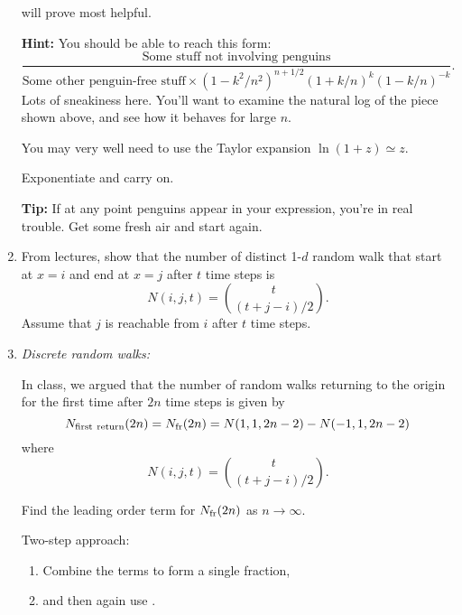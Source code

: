 \begin{enumerate}
  will prove most helpful.

  \textbf{Hint:}
  You should be able to reach this form:
  $$
  \frac{
    \mbox{Some stuff not involving penguins}
  }{
    \mbox{Some other penguin-free stuff} \times
    (1-k^2/n^2)^{n+1/2} 
    (1+k/n)^{k}(1-k/n)^{-k}
  }.
  $$
  Lots of sneakiness here.  You'll want to examine
  the natural log of the piece shown above, and see
  how it behaves for large $n$.  

  You may very well need to use
  the Taylor expansion $\ln(1+z) \simeq z$.
  
  Exponentiate and carry on.

  \textbf{Tip:}
  If at any point penguins appear in your expression, 
  you're in real trouble.  Get some fresh air and start again.

  
   \solutionstart


   \solutionend



\item 

  From lectures, show that the number of distinct 
  1-$d$ random walk that start at $x=i$ and end 
  at $x=j$ after $t$ time steps is
  $$
  N(i,j,t) = \binom{t}{(t+j-i)/2}. 
  $$
  Assume that $j$ is reachable from $i$ after $t$ time steps.



  
   \solutionstart


   \solutionend

\item 

  \textit{Discrete random walks:}

  In class, we argued that
  the number of random walks returning
  to the origin for the first time
  after $2n$ time steps is given by
  $$
  N_{\rm first\ return}(2n) 
  =
  N_{\rm fr}(2n) 
  = 
  N(1,1,2n-2) - N(-1,1,2n-2)
  $$
  where
  $$ 
  N(i,j,t) = \binom{t}{(t+j-i)/2}. 
  $$

  Find the leading order term for $N_{\rm fr}(2n)$
  as $n \rightarrow \infty$.

  Two-step approach:
  \begin{enumerate}
  \item 
    Combine the terms to form a single fraction,
  \item
    and then again use 
    .
  \end{enumerate}


\end{enumerate}
